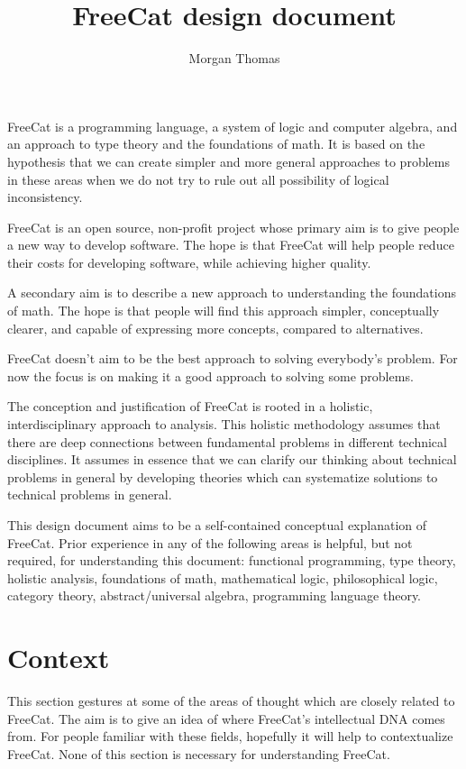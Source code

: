 \documentclass{article}
\title{FreeCat design document}
\author{Morgan Thomas}
\begin{document}
\maketitle

FreeCat is a programming language, a system of logic and computer algebra, and an approach to type theory and the foundations of math. It is based on the hypothesis that we can create simpler and more general approaches to problems in these areas when we do not try to rule out all possibility of logical inconsistency.

FreeCat is an open source, non-profit project whose primary aim is to give people a new way to develop software. The hope is that FreeCat will help people reduce their costs for developing software, while achieving higher quality.

A secondary aim is to describe a new approach to understanding the foundations of math. The hope is that people will find this approach simpler, conceptually clearer, and capable of expressing more concepts, compared to alternatives.

FreeCat doesn't aim to be the best approach to solving everybody's problem. For now the focus is on making it a good approach to solving some problems.

The conception and justification of FreeCat is rooted in a holistic, interdisciplinary approach to analysis. This holistic methodology assumes that there are deep connections between fundamental problems in different technical disciplines. It assumes in essence that we can clarify our thinking about technical problems in general by developing theories which can systematize solutions to technical problems in general.

This design document aims to be a self-contained conceptual explanation of FreeCat. Prior experience in any of the following areas is helpful, but not required, for understanding this document: functional programming, type theory, holistic analysis, foundations of math, mathematical logic, philosophical logic, category theory, abstract/universal algebra, programming language theory.

\section{Context}

This section gestures at some of the areas of thought which are closely related to FreeCat. The aim is to give an idea of where FreeCat's intellectual DNA comes from. For people familiar with these fields, hopefully it will help to contextualize FreeCat. None of this section is necessary for understanding FreeCat.
\end{document}
